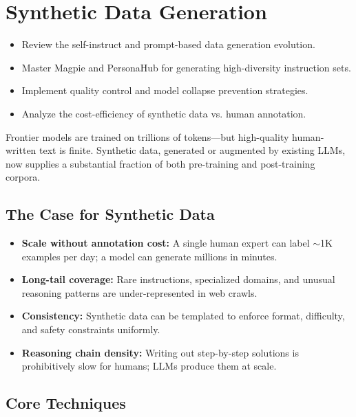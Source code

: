 \chapter{Synthetic Data Generation}
\minitoc

\begin{chapteroverview}
  \begin{itemize}
    \item Review the self-instruct and prompt-based data generation evolution.
    \item Master Magpie and PersonaHub for generating high-diversity instruction sets.
    \item Implement quality control and model collapse prevention strategies.
    \item Analyze the cost-efficiency of synthetic data vs. human annotation.
  \end{itemize}
\end{chapteroverview}

Frontier models are trained on trillions of tokens---but high-quality human-written text is finite. Synthetic data, generated or augmented by existing LLMs, now supplies a substantial fraction of both pre-training and post-training corpora.

\section{The Case for Synthetic Data}

\begin{itemize}
  \item \textbf{Scale without annotation cost:} A single human expert can label $\sim$1K examples per day; a model can generate millions in minutes.
  \item \textbf{Long-tail coverage:} Rare instructions, specialized domains, and unusual reasoning patterns are under-represented in web crawls.
  \item \textbf{Consistency:} Synthetic data can be templated to enforce format, difficulty, and safety constraints uniformly.
  \item \textbf{Reasoning chain density:} Writing out step-by-step solutions is prohibitively slow for humans; LLMs produce them at scale.
\end{itemize}

\section{Core Techniques}

